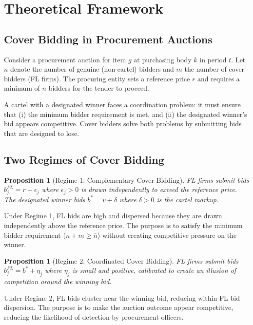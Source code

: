 \documentclass[12pt]{elsarticle}
\newtheorem{proposition}[theorem]{Proposition}
\begin{document}
\section{Theoretical Framework}
\label{sec:theory}

\subsection{Cover Bidding in Procurement Auctions}

Consider a procurement auction for item $g$ at purchasing body $k$ in period $t$. Let $n$ denote the number of genuine (non-cartel) bidders and $m$ the number of cover bidders (FL firms). The procuring entity sets a reference price $r$ and requires a minimum of $\bar{n}$ bidders for the tender to proceed.

A cartel with a designated winner faces a coordination problem: it must ensure that (i) the minimum bidder requirement is met, and (ii) the designated winner's bid appears competitive. Cover bidders solve both problems by submitting bids that are designed to lose.

\subsection{Two Regimes of Cover Bidding}

\begin{proposition}[Regime 1: Complementary Cover Bidding]
FL firms submit bids $b_j^{FL} = r + \epsilon_j$ where $\epsilon_j > 0$ is drawn independently to exceed the reference price. The designated winner bids $b^* = v + \delta$ where $\delta > 0$ is the cartel markup.
\end{proposition}

Under Regime 1, FL bids are high and dispersed because they are drawn independently above the reference price. The purpose is to satisfy the minimum bidder requirement ($n + m \geq \bar{n}$) without creating competitive pressure on the winner.

\begin{proposition}[Regime 2: Coordinated Cover Bidding]
FL firms submit bids $b_j^{FL} = b^* + \eta_j$ where $\eta_j$ is small and positive, calibrated to create an illusion of competition around the winning bid.
\end{proposition}

Under Regime 2, FL bids cluster near the winning bid, reducing within-FL bid dispersion. The purpose is to make the auction outcome appear competitive, reducing the likelihood of detection by procurement officers.
\end{document}
